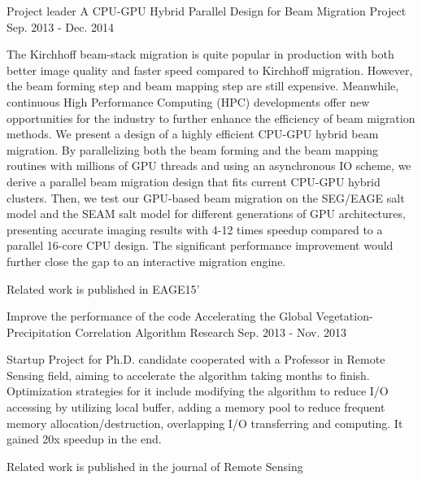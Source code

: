 \documentclass[11pt, a4paper]{awesome-cv}
\begin{document}
\begin{cventries}
  \cventry
    {Project leader} %
    {A CPU-GPU Hybrid Parallel Design for Beam Migration} %
    {Project} %
    {Sep. 2013 - Dec. 2014} %
    {
      \begin{cvitems} %
        \item {The Kirchhoff beam-stack migration is quite popular in production with both better image quality and faster speed compared to Kirchhoff migration.  However, the beam forming step and beam mapping step are still expensive. Meanwhile, continuous High Performance Computing (HPC) developments offer new opportunities for the industry to further enhance the efficiency of beam migration methods. We present a design of a highly efficient CPU-GPU hybrid beam migration.  By parallelizing both the beam forming and the beam mapping routines with millions of GPU threads and using an asynchronous IO scheme, we derive a parallel beam migration design that fits current CPU-GPU hybrid clusters.  Then, we test our GPU-based beam migration on the SEG/EAGE salt model and the SEAM salt model for different generations of GPU architectures, presenting accurate imaging results with 4-12 times speedup compared to a parallel 16-core CPU design. The significant performance improvement would further close the gap to an interactive migration engine.}
        \item {Related work is published in EAGE15'}
      \end{cvitems}
    }
    
  \cventry
    {Improve the performance of the code} %
    {Accelerating the Global Vegetation-Precipitation Correlation Algorithm} %
    {Research} %
    {Sep. 2013 - Nov. 2013} %
    {
      \begin{cvitems} %
        \item {Startup Project for Ph.D. candidate cooperated with a Professor in Remote Sensing field, aiming to accelerate the algorithm taking months to finish. Optimization strategies for it include modifying the algorithm to reduce I/O accessing by utilizing local buffer, adding a memory pool to reduce frequent memory allocation/destruction, overlapping I/O transferring and computing. It gained 20x speedup in the end.}
        \item {Related work is published in the journal of Remote Sensing}
      \end{cvitems}
    }

\end{cventries}
\end{document}
